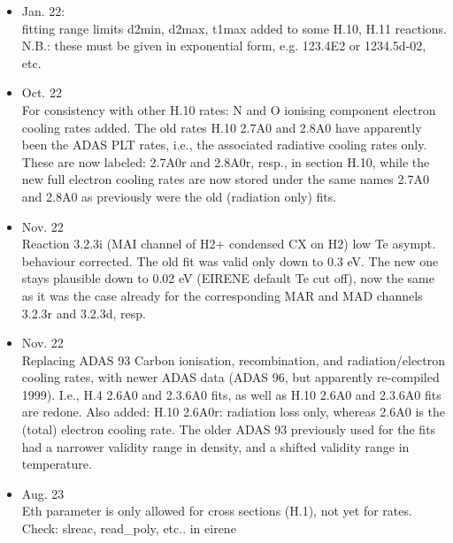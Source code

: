 \documentclass[12pt,dvipdfmx]{article}
\begin{document}
\begin{itemize}
H.2 3.2.3 renamed to H.2 3.2.3g, because Greenland's vibr. distribution is included.
H.3 3.2.3 renamed to H.3 3.2.3g, because Greenland's vibr. distribution is included.
Kept here with both names (via an alias) for backward compatibility with old input files only.
A corresponding ``thermal" H.2 3.2.3 (without ``g") has been added in hydhel.tex, without that vibr. distribution,
i.e., just a thermal rate coefficient from the vibr. ground state data.
\item Jan. 22: \\
fitting range limits d2min, d2max, t1max added to some H.10, H.11 reactions.
N.B.: these must be given in exponential form, e.g. 123.4E2 or 1234.5d-02, etc.
\item Oct. 22 \\
For consistency with other H.10 rates: N and O ionising component electron cooling rates added. The old rates H.10 2.7A0 and 2.8A0 have
apparently been
the ADAS PLT rates, i.e., the associated radiative cooling rates only.
These are now labeled: 2.7A0r and 2.8A0r, resp., in section H.10, while the new full electron cooling rates
are now stored under the same names 2.7A0 and 2.8A0 as previously were the old (radiation only) fits.
\item Nov. 22 \\
Reaction 3.2.3i (MAI channel of H2+ condensed CX on H2) low Te asympt. behaviour corrected.
The old fit was valid only down to 0.3 eV. The new one stays plausible down to 0.02 eV (EIRENE default Te cut off),
now the same as it was the case already for the corresponding MAR and MAD channels 3.2.3r and 3.2.3d, resp.
\item Nov. 22 \\
Replacing ADAS 93 Carbon ionisation, recombination, and radiation/electron cooling rates, with
newer ADAS data (ADAS 96, but apparently re-compiled 1999). I.e.,  H.4 2.6A0 and 2.3.6A0 fits,
as well as H.10 2.6A0 and 2.3.6A0 fits are redone.
Also added: H.10 2.6A0r: radiation loss only, whereas 2.6A0
is the (total) electron cooling rate. The older ADAS 93 previously used for the fits
had a narrower validity range in density, and
a shifted validity range in temperature.
\item Aug. 23 \\
Eth parameter is only allowed for cross sections (H.1),
not yet for rates. Check: slreac, read_poly, etc.. in eirene
\end{itemize}
\end{document}
